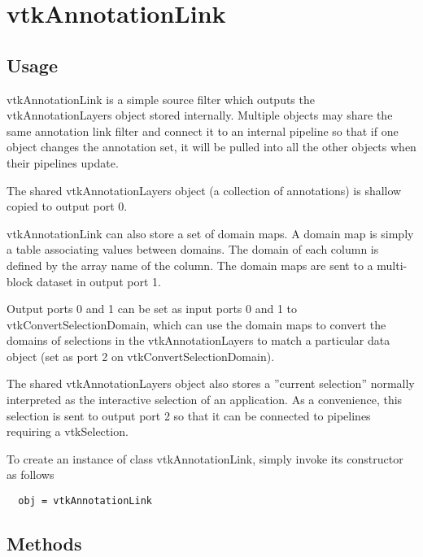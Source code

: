 \section{vtkAnnotationLink}

\subsection{Usage}

 vtkAnnotationLink is a simple source filter which outputs the
 vtkAnnotationLayers object stored internally.  Multiple objects may share
 the same annotation link filter and connect it to an internal pipeline so
 that if one object changes the annotation set, it will be pulled into all
 the other objects when their pipelines update.

 The shared vtkAnnotationLayers object (a collection of annotations) is
 shallow copied to output port 0.

 vtkAnnotationLink can also store a set of domain maps. A domain map is
 simply a table associating values between domains. The domain of each
 column is defined by the array name of the column. The domain maps are
 sent to a multi-block dataset in output port 1.

 Output ports 0 and 1 can be set as input ports 0 and 1 to
 vtkConvertSelectionDomain, which can use the domain maps to convert the
 domains of selections in the vtkAnnotationLayers to match a particular
 data object (set as port 2 on vtkConvertSelectionDomain).

 The shared vtkAnnotationLayers object also stores a ''current selection''
 normally interpreted as the interactive selection of an application.
 As a convenience, this selection is sent to output port 2 so that it
 can be connected to pipelines requiring a vtkSelection.

To create an instance of class vtkAnnotationLink, simply
invoke its constructor as follows
\begin{verbatim}
  obj = vtkAnnotationLink
\end{verbatim}
\subsection{Methods}

